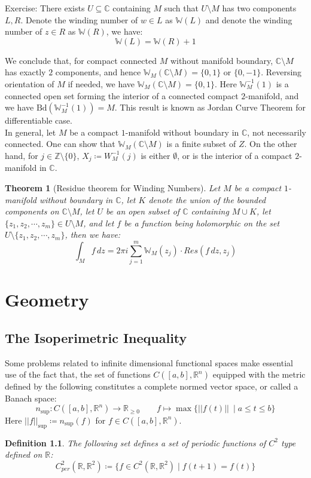 \documentclass[15pt]{book}
\theoremstyle{break}
\theoremstyle{break}
\newtheorem{thm}{Theorem}[section]
\newtheorem{defn}{Definition}[corL]
\newcommand{\R}{\mathbb{R}}
\newcommand{\Z}{\mathbb{Z}}
\newcommand{\Bd}{\text{Bd}}
\newcommand{\Complex}{\mathbb{C}}
\newcommand{\exercise}{\color{green}Exercise: \color{black}}
\begin{document}
\exercise There exists $U\subseteq \Complex$ containing $M$ such that $U \setminus M$ has two components $L,R$. Denote the winding number of $w \in L$ as $\mathbb{W}(L)$ and denote the winding number of $z \in R$ as $\mathbb{W}(R)$, we have: 
$$\mathbb{W}(L) = \mathbb{W}(R)+1$$

We conclude that, for compact connected $M$ without manifold boundary, $\Complex\setminus M$ has exactly $2$ components, and hence $\mathbb{W}_M(\Complex \setminus M) = \{0,1\}$ or $\{0,-1\}$. Reversing orientation of $M$ if needed, we have $\mathbb{W}_M(\Complex \setminus M) = \{0,1\}$. Here $\mathbb{W}_M^{-1}(1)$ is a connected open set forming the interior of a connected compact $2$-manifold, and we have $\Bd(\mathbb{W}_M^{-1}(1)) = M$. This result is known as Jordan Curve Theorem for differentiable case.\\

In general, let $M$ be a compact $1$-manifold without boundary in $\Complex$, not necessarily connected. One can show that $\mathbb{W}_M(\Complex \setminus M) $ is a finite subset of $Z$. On the other hand, for $j \in \Z\setminus \{0\}$, $X_j \coloneqq W_M^{-1}(j)$ is either $\emptyset$, or is the interior of a compact $2$-manifold in $\Complex$.\\

\begin{thm}[Residue theorem for Winding Numbers]
Let $M$ be a compact $1$-manifold without boundary in $\Complex$, let $K$ denote the union of the bounded components on $\Complex \setminus M$, let $U$ be an open subset of $\Complex$ containing $M\cup K$, let $\{z_1,z_2,\cdots, z_m\} \in U\setminus M$, and let $f$ be a function being holomorphic on the set $U \setminus \{z_1,z_2,\cdots, z_m\}$,  then we have:
$$\int_M f\, dz = 2\pi i \sum_{j=1}^m \mathbb{W}_M(z_j) \cdot Res(f\, dz, z_j)$$
\end{thm}
 


\newpage
\chapter{Geometry}
\setcounter{section}{40}
\section[The Isoperimetric Inequality]{\color{red}The Isoperimetric Inequality \color{black}}
Some problems related to infinite dimensional functional spaces make essential use of the fact that, the set of functions $C([a,b],\R^n)$ equipped with the metric defined by the following constitutes a complete normed vector space, or called a Banach space: $$n_{\sup}: C([a,b],\R^n) \to \R_{\geq 0} \qquad f \mapsto \max\{||f(t)||\ \mid a\leq t\leq b\}$$
Here $||f||_{\sup} \coloneqq n_{\sup}(f)$ for $f \in C([a,b],\R^n)$.
\hfill\break
\begin{defn}
The following set defines a set of periodic functions of $C^2$ type defined on $\R$:
$$C^2_{per}(\R, \R^2) \coloneqq \{ f \in C^2(\R,\R^2)\mid f(t+1) = f(t)\}$$ 
\end{defn}
\hfill\break
\end{document}
